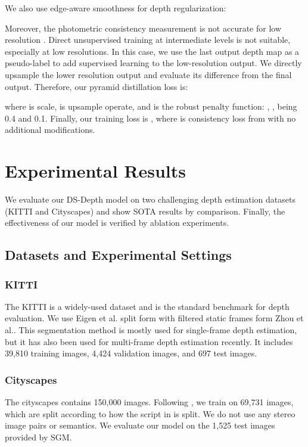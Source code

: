 \documentclass[journal]{IEEEtran}
\begin{document}
We also use edge-aware smoothness for depth regularization:


Moreover, the photometric consistency measurement is not accurate for low resolution \cite{jonschkowski2020matters, chen2021fixing}. Direct unsupervised training at intermediate levels is not suitable, especially at low resolutions. In this case, we use the last output depth map as a pseudo-label to add supervised learning to the low-resolution output. We directly upsample the lower resolution output and evaluate its difference from the final output. Therefore, our pyramid distillation loss is:

where  is scale,  is upsample operate, and  is the robust penalty function\cite{liu2019ddflow}: , ,  being 0.4 and 0.1.
Finally, our training loss is , where  is consistency loss from \cite{manydepth} with no additional modifications.

\section{Experimental Results}
We evaluate our DS-Depth model on two challenging depth estimation datasets (KITTI \cite{geiger2012we} and Cityscapes\cite{cordts2016cityscapes}) and show SOTA results by comparison. Finally, the effectiveness of our model is verified by ablation experiments.

\subsection{Datasets and Experimental Settings}
\subsubsection{KITTI}
The KITTI is a widely-used dataset and is the standard benchmark for depth evaluation. We use Eigen et al. split form \cite{eigen2015predicting} with filtered static frames form Zhou et al.\cite{zhou2017unsupervised}. This segmentation method is mostly used for single-frame depth estimation, but it has also been used for multi-frame depth estimation recently\cite{manydepth,feng2022disentangling}. It includes 39,810 training images, 4,424 validation images, and 697 test images.

\subsubsection{Cityscapes}
The cityscapes contains 150,000 images. Following \cite{yang2018lego,zhou2017unsupervised,manydepth}, we train on 69,731 images, which are split according to how the script in \cite{zhou2017unsupervised}  is split. We do not use any stereo image pairs or semantics. We evaluate our model on the 1,525 test images provided by SGM\cite{hirschmuller2007stereo}.
\end{document}

